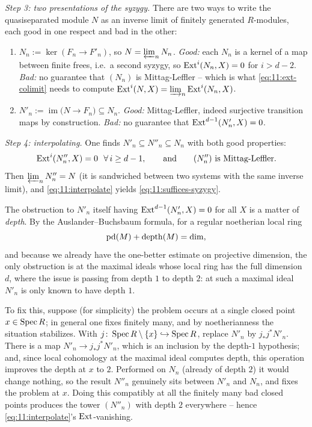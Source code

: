 \emph{Step 3: two presentations of the syzygy.} There are two ways to write the
quasiseparated module $N$ as an inverse limit of finitely generated
$R$-modules, each good in one respect and bad in the other:
\begin{enumerate}
\item $N_{n}:=\ker(F_{n}\to F'_{n})$, so $N=\varprojlim_{n}N_{n}$. \emph{Good:}
each $N_{n}$ is a kernel of a map between finite frees, i.e.\ a second syzygy,
so $\operatorname{Ext}^{i}(N_{n},X)=0$ for $i>d-2$. \emph{Bad:} no guarantee that $(N_{n})$
is Mittag-Leffler -- which is what \eqref{eq:11:ext-colimit} needs to compute
$\operatorname{Ext}^{i}(N,X)=\varinjlim_{n}\operatorname{Ext}^{i}(N_{n},X)$.
\item $N'_{n}:=\operatorname{im}\bigl(N\to F_{n}\bigr)\subseteq N_{n}$.
\emph{Good:} Mittag-Leffler, indeed surjective transition maps by construction.
\emph{Bad:} no guarantee that $\operatorname{Ext}^{d-1}(N'_{n},X)=0$.
\end{enumerate}

\emph{Step 4: interpolating.} One finds $N'_{n}\subseteq N''_{n}\subseteq N_{n}$
with both good properties:
\begin{equation}
\label{eq:11:interpolate}
\operatorname{Ext}^{i}(N''_{n},X)=0\ \ \forall\,i\ge d-1,\qquad\text{and}\qquad (N''_{n})\
\text{is Mittag-Leffler.}
\end{equation}
Then $\varprojlim_{n}N''_{n}=N$ (it is sandwiched between two systems with the
same inverse limit), and \eqref{eq:11:interpolate} yields
\eqref{eq:11:suffices-syzygy}.

The obstruction to $N'_{n}$ itself having $\operatorname{Ext}^{d-1}(N'_{n},X)=0$ for all $X$
is a matter of \emph{depth}. By the Auslander--Buchsbaum formula, for a regular
noetherian local ring
\begin{equation*}
\operatorname{pd}(M)+\operatorname{depth}(M)=\dim,
\end{equation*}
and because we already have the one-better estimate on projective dimension,
the only obstruction is at the maximal ideals whose local ring has the full
dimension $d$, where the issue is passing from depth $1$ to depth $2$: at such
a maximal ideal $N'_{n}$ is only known to have depth $1$.

To fix this, suppose (for simplicity) the problem occurs at a single closed
point $x\in\operatorname{Spec} R$; in general one fixes finitely many, and by
noetherianness the situation stabilizes. With $j\colon\operatorname{Spec} R\setminus\{x\}
\hookrightarrow\operatorname{Spec} R$, replace $N'_{n}$ by $j_{*}j^{*}N'_{n}$. There is a map
$N'_{n}\to j_{*}j^{*}N'_{n}$, which is an inclusion by the depth-$1$ hypothesis;
and, since local cohomology at the maximal ideal computes depth, this operation
improves the depth at $x$ to $2$. Performed on $N_{n}$ (already of depth $2$) it
would change nothing, so the result $N''_{n}$ genuinely sits between $N'_{n}$
and $N_{n}$, and fixes the problem at $x$. Doing this compatibly at all the
finitely many bad closed points produces the tower $(N''_{n})$ with depth $2$
everywhere -- hence \eqref{eq:11:interpolate}'s $\operatorname{Ext}$-vanishing.


